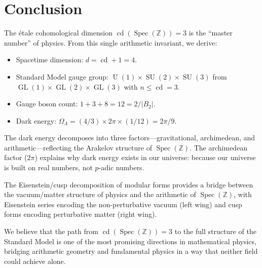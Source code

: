 \documentclass[12pt,a4paper]{article}
\theoremstyle{definition}
\newcommand{\Spec}{\operatorname{Spec}}
\newcommand{\GL}{\operatorname{GL}}
\newcommand{\SU}{\operatorname{SU}}
\newcommand{\cd}{\operatorname{cd}}
\newcommand{\Z}{\mathbb{Z}}
\newcommand{\OmL}{\Omega_\Lambda}
\newcommand{\U}{\operatorname{U}}
\begin{document}
\section{Conclusion}\label{sec:conclusion}

The \'etale cohomological dimension $\cd(\Spec(\Z))=3$ is the
``master number'' of physics.
From this single arithmetic invariant, we derive:
\begin{itemize}
  \item Spacetime dimension: $d = \cd + 1 = 4$.
  \item Standard Model gauge group:
    $\U(1)\times\SU(2)\times\SU(3)$ from $\GL(1)\times\GL(2)\times\GL(3)$
    with $n\le\cd=3$.
  \item Gauge boson count: $1+3+8 = 12 = 2/|B_2|$.
  \item Dark energy:
    $\OmL = (4/3)\times 2\pi\times(1/12) = 2\pi/9$.
\end{itemize}

The dark energy decomposes into three factors---gravitational,
archimedean, and arithmetic---reflecting the Arakelov structure
of $\Spec(\Z)$.
The archimedean factor ($2\pi$) explains why dark energy exists
in our universe: because our universe is built on real numbers,
not $p$-adic numbers.

The Eisenstein/cusp decomposition of modular forms provides
a bridge between the vacuum/matter structure of physics and
the arithmetic of $\Spec(\Z)$, with Eisenstein series encoding
the non-perturbative vacuum (left wing) and cusp forms encoding
perturbative matter (right wing).

We believe that the path from $\cd(\Spec(\Z))=3$ to the full
structure of the Standard Model is one of the most promising
directions in mathematical physics, bridging arithmetic geometry
and fundamental physics in a way that neither field could
achieve alone.
\end{document}
